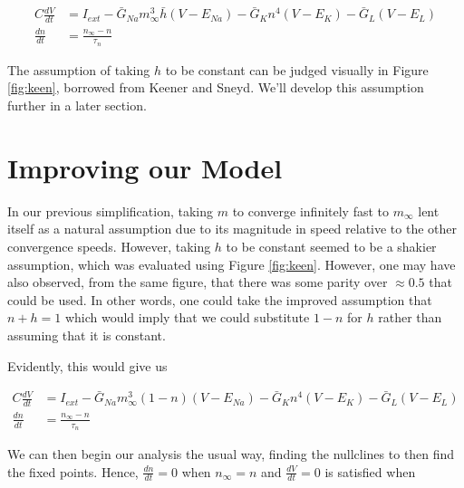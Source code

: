 \documentclass{article}
\begin{document}
\begin{align*}
        C\frac{dV}{dt} &= I_{ext} -\bar{G}_{Na}m_\infty^3\bar{h}(V-E_{Na}) -\bar{G}_{K}n^4(V-E_{K})  -\bar{G}_{L}(V-E_{L}) \\
    \frac{dn}{dt} &= \frac{n_{\infty}-n}{\tau_n} 
\end{align*}

The assumption of taking $h$ to be constant can be judged visually in Figure \ref{fig:keen}, borrowed from Keener and Sneyd\cite{keener}. We'll develop this assumption further in a later section.




\section{Improving our Model}

In our previous simplification, taking $m$ to converge infinitely fast to $m_\infty$ lent itself as a natural assumption due to its magnitude in speed relative to the other convergence speeds. However, taking $h$ to be constant seemed to be a shakier assumption, which was evaluated using Figure \ref{fig:keen}. However, one may have also observed, from the same figure, that there was some parity over $\approx 0.5$ that could be used. In other words, one could take the improved assumption that $n + h = 1$ which would imply that we could substitute $1 - n$ for $h$ rather than assuming that it is constant.

Evidently, this would give us

\begin{align*}
        C\frac{dV}{dt} &= I_{ext}-\bar{G}_{Na}m_\infty^3(1-n)(V-E_{Na}) -\bar{G}_{K}n^4(V-E_{K})  -\bar{G}_{L}(V-E_{L}) \\
    \frac{dn}{dt} &= \frac{n_{\infty}-n}{\tau_n} 
\end{align*}

We can then begin our analysis the usual way, finding the nullclines to then find the fixed points. Hence, $\frac{dn}{dt}=0$ when $n_{\infty}=n$ and $\frac{dV}{dt}=0$ is satisfied when
\end{document}
